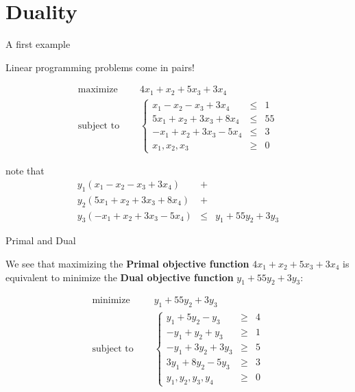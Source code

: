 \documentclass[c]{beamer}
\begin{document}
\section{Duality}
\begin{frame}[allowframebreaks]{A first example}

  Linear programming problems come in pairs!

  \begin{equation*}
    \begin{aligned}
      \text{maximize  } \quad & 4x_1 + x_2 +5x_3 +3x_4 \\
      \text{subject to }\quad &
      \left\{
      \begin{array}{rcl}
        x_1 - x_2 -x_3 +3x_4 &\leq &1 \\
        5x_1 + x_2 +3x_3 +8x_4 &\leq &55 \\
        -x_1 + x_2 +3x_3 -5x_4 &\leq &3 \\
        x_1,x_2,x_3 &\geq& 0
      \end{array}
      \right.
    \end{aligned}
  \end{equation*}

note that
\begin{eqnarray*}
  y_1(x_1 - x_2 -x_3 +3x_4)&+&\\y_2(5x_1 + x_2 +3x_3 +8x_4)&+&\\y_3(-x_1 + x_2 +3x_3 -5x_4) &\leq& y_1+55y_2+3y_3
\end{eqnarray*}

\end{frame}
\begin{frame}{Primal and Dual}

We see that maximizing the {\bf Primal objective function} $4x_1 + x_2 +5x_3 +3x_4$ is
  equivalent to minimize the {\bf Dual objective function} $y_1+55y_2+3y_3$:

    \begin{equation*}
    \begin{aligned}
      \text{minimize } \quad & y_1+55y_2+3y_3 \\
      \text{subject to }\quad &
      \left\{
      \begin{array}{rcl}
        y_1 + 5y_2 -y_3 &\geq &4 \\
        -y_1 +y_2 +y_3 &\geq &1 \\
        -y_1 +3y_2 +3y_3 &\geq &5 \\
        3y_1 +8y_2 -5y_3 &\geq &3 \\
        y_1,y_2,y_3,y_4 &\geq& 0
      \end{array}
      \right.
    \end{aligned}
  \end{equation*}

  \end{frame}
\end{document}
